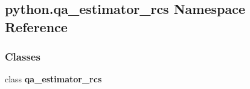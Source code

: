 \subsection{python.\+qa\+\_\+estimator\+\_\+rcs Namespace Reference}
\label{namespacepython_1_1qa__estimator__rcs}
\subsubsection*{Classes}
\begin{DoxyCompactItemize}
\item 
class {\bf qa\+\_\+estimator\+\_\+rcs}
\end{DoxyCompactItemize}
